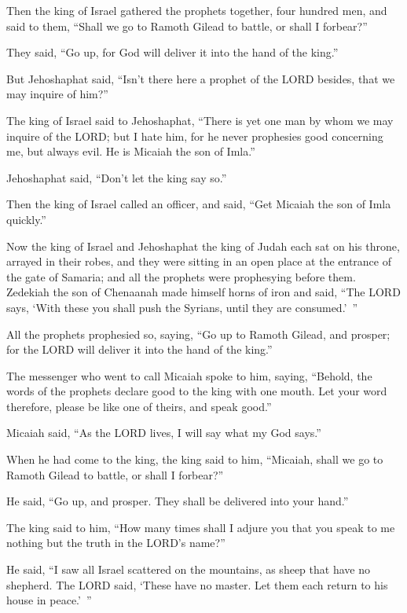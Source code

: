 \myverse{}Then the king of Israel gathered the prophets together, four hundred
men, and said to them, “Shall we go to Ramoth Gilead to battle, or shall I forbear?”

They said, “Go up, for God will deliver it into the hand of the king.”

\myverse{}But Jehoshaphat said, “Isn’t there here a prophet of the LORD
besides, that we may inquire of him?”

\myverse{}The king of Israel said to Jehoshaphat, “There is yet one man
by whom we may inquire of the LORD; but I hate him, for he never prophesies good concerning me, but always
evil. He is Micaiah the son of Imla.”

Jehoshaphat said, “Don’t let the king say so.”

\myverse{}Then the king of Israel called an officer, and said, “Get Micaiah
the son of Imla quickly.”

\myverse{}Now the king of Israel and Jehoshaphat the king of Judah each
sat on his throne, arrayed in their robes, and they were sitting in an open place at the entrance of the
gate of Samaria; and all the prophets were prophesying before them.
\myverse{}Zedekiah the son of Chenaanah made himself horns of iron and said, “The LORD
says, ‘With these you shall push the Syrians, until they are consumed.’ ”

\myverse{}All the prophets prophesied so, saying, “Go up to Ramoth Gilead,
and prosper; for the LORD will deliver it into the hand of the king.”

\myverse{}The messenger who went to call Micaiah spoke to him, saying,
“Behold, the words of the prophets declare good to the king with one mouth. Let your word therefore, please
be like one of theirs, and speak good.”

\myverse{}Micaiah said, “As the LORD lives, I will say what my God says.”

\myverse{}When he had come to the king, the king said to him, “Micaiah,
shall we go to Ramoth Gilead to battle, or shall I forbear?”

He said, “Go up, and prosper. They shall be delivered into your hand.”

\myverse{}The king said to him, “How many times shall I adjure you that
you speak to me nothing but the truth in the LORD’s name?”

\myverse{}He said, “I saw all Israel scattered on the mountains, as sheep
that have no shepherd. The LORD said, ‘These have no master. Let them each return to his house in peace.’ ”

